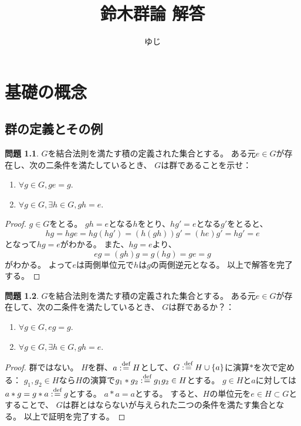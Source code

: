 \documentclass[uplatex]{jsreport}
\title{鈴木群論 解答}
\author{ゆじ}
\theoremstyle{definition}
\newtheorem{prob}[prob]{問題}
\newcommand{\dfn}{:\overset{\mbox{{\scriptsize def}}}{=}}
\begin{document}
\maketitle

\chapter{基礎の概念}


\section{群の定義とその例}


\begin{prob}
  \(G\)を結合法則を満たす積の定義された集合とする。
  ある元\(e\in G\)が存在し、次の二条件を満たしているとき、
  \(G\)は群であることを示せ：
  \begin{enumerate}
    \item
    \(\forall g\in G, ge=g\).
    \item
    \(\forall g\in G, \exists h\in G, gh = e\).
  \end{enumerate}
\end{prob}

\begin{proof}
  \(g\in G\)をとる。
  \(gh=e\)となる\(h\)をとり、\(hg'=e\)となる\(g'\)をとると、
  \[
  hg = hge = hg(hg') = (h(gh))g' = (he)g' = hg' = e
  \]
  となって\(hg = e\)がわかる。
  また、\(hg = e\)より、
  \[eg = (gh)g = g(hg) = ge = g\]
  がわかる。
  よって\(e\)は両側単位元で\(h\)は\(g\)の両側逆元となる。
  以上で解答を完了する。
\end{proof}




\begin{prob}
  \(G\)を結合法則を満たす積の定義された集合とする。
  ある元\(e\in G\)が存在して、次の二条件を満たしているとき、
  \(G\)は群であるか？：
  \begin{enumerate}
    \item
    \(\forall g\in G, eg = g\).
    \item
    \(\forall g\in G, \exists h\in G, gh = e\).
  \end{enumerate}
\end{prob}

\begin{proof}
  群ではない。
  \(H\)を群、\(a\dfn H\)として、\(G\dfn H\cup\{a\}\)に演算\(*\)を次で定める：
  \(g_1,g_2\in H\)なら\(H\)の演算で\(g_1*g_2 \dfn g_1g_2\in H\)とする。
  \(g\in H\)と\(a\)に対しては\(a*g=g*a\dfn g\)とする。
  \(a*a = a\)とする。
  すると、\(H\)の単位元を\(e\in H\subset G\)とすることで、
  \(G\)は群とはならないが与えられた二つの条件を満たす集合となる。
  以上で証明を完了する。
\end{proof}
\end{document}
